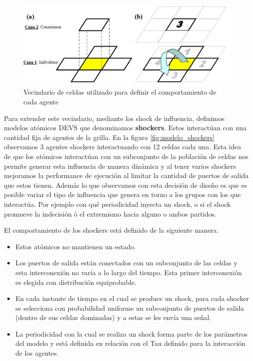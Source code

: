 \begin{figure}[!h]
\centering
\includegraphics[scale=0.5]{imagenes/modelo_pina.png}
\caption{Vecindario de celdas utilizado para definir el comportamiento de cada agente}
\label{fig:modelo_pina}
\end{figure}

Para extender este vecindario, mediante los shock de influencia, definimos modelos atómicos DEVS que denominamos \textbf{shockers}. Estos interactúan con una cantidad fija de agentes de la grilla. En la figura \ref{fig:modelo_shockers} observamos 3 agentes shockers interactuando con 12 celdas cada una. Esta idea de que los atómicos interactúan con un subconjunto de la población de celdas nos permite generar esta influencia de manera dinámica y al tener varios shockers mejoramos la performance de ejecución al limitar la cantidad de puertos de salida que estos tienen. Además lo que observamos con esta decisión de diseño es que es posible variar el tipo de influencia que genera en torno a los grupos con los que interactúa. Por ejemplo con qué periodicidad inyecta un shock, o si el shock promueve la indecisión ó el extremismo hacia alguno o ambos partidos.

El comportamiento de los shockers está definido de la siguiente manera.

\begin{itemize}
\item Estos atómicos no mantienen un estado.
\item Los puertos de salida están conectados con un subconjunto de las celdas y esta interconexión no varía a lo largo del tiempo. Esta primer interconexión es elegida con distribución equiprobable.
\item En cada instante de tiempo en el cual se produce un shock, para cada shocker se selecciona con probabilidad uniforme un subconjunto de puertos de salida (dentro de sus celdas dominadas) y a estas se les envía una señal.
\item La periodicidad con la cual se realiza un shock forma parte de los parámetros del modelo y está definida en relación con el Tau definido para la interacción de los agentes.
\end{itemize}

